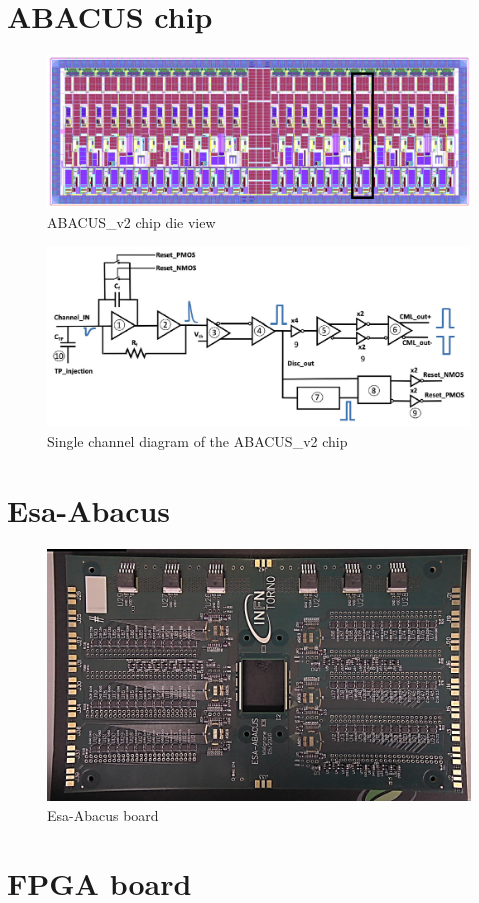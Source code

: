 \section{ABACUS chip}\label{chip}
\begin{figure}[H]
	\centering
	\includegraphics[width=0.9\linewidth]{IMG/ch2/ABACUS2.png}
	\caption{ABACUS\_v2 chip die view}
	\label{fig:abacus2}
\end{figure}

\begin{figure}[H]
	\centering
	\includegraphics[width=0.8\linewidth]{IMG/ch2/Abacus_channel.png}
	\caption{Single channel diagram of the ABACUS\_v2 chip}
	\label{fig:abacuschannel}
\end{figure}

\section{Esa-Abacus}\label{esaabacus}
\begin{figure}[H]
	\centering
	\includegraphics[width=0.7\linewidth]{IMG/ch2/EsaAbacus.png}
	\caption{Esa-Abacus board}
	\label{fig:esaabacus}
\end{figure}

\section{FPGA board}

